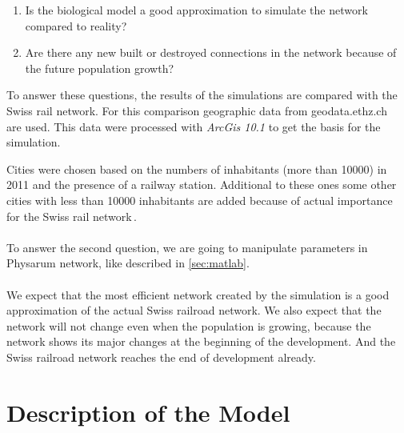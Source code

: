 \documentclass[11pt]{scrartcl}
\begin{document}
\begin{enumerate}
	\item Is the biological model a good approximation to simulate the network compared to reality?
	\item Are there any new built or destroyed connections in the network because of the future population growth?
\end{enumerate}

To answer these questions, the results of the simulations are compared with the Swiss rail network. For this comparison geographic data from geodata.ethz.ch~\cite{gis_data} are used. This data were processed with \textit{ArcGis 10.1} to get the basis for the simulation.

Cities were chosen based on the numbers of inhabitants (more than 10000) in 2011 and the presence of a railway station. Additional to these ones some other cities with less than 10000 inhabitants are added because of actual importance for the Swiss rail network\,\cite{bfs}. ~\\
~\\
To answer the second question, we are going to manipulate parameters in Physarum network, like described  in \ref{sec:matlab}.\\
~\\
We expect that the most efficient network created by the simulation is a good approximation of the actual Swiss railroad network. We also expect that the network will not change even when the population is growing, because the network shows its major changes at the beginning of the development. And the Swiss railroad network reaches the end of development already.




\section{Description of the Model}
\label{sec:description}
\end{document}
